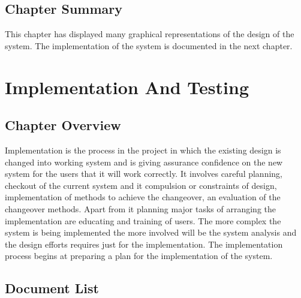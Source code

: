 \documentclass[12pt,a4paper]{article}
\newcommand\tab[1][1cm]{\hspace*{#1}}
\begin{document}
\begin{comment}
\subsection{Flow Charts}
	A flow chart is a diagram used to represent the process flow of an algorithm, problem or some transaction
within a business. Therefore a flow chart (Figure \ref{fig:flowchart}) was used to graphically represent the process
flow of an order.
\begin{figure}[H]
		\centering
		\texttt{[image: /home/basedul/Documents/Report-writing-using-latex/ResturentManagementSystemReport/flowchart.png]}
		\caption{Flow chart to show the flow of events of an order..}
		\label{fig:flowchart} 
\end{figure}
\end{comment}

\subsection{Chapter Summary}
	\tab This chapter has displayed many graphical representations of the design of the system. The implementation of the system is documented in the next chapter.
\newpage
\section{Implementation And Testing}
	\subsection{Chapter Overview}
	\tab Implementation is the process in the project in which the existing design is changed into working system and is giving assurance confidence on the new system for the users that it will work correctly. It involves careful planning, checkout of the current system and it compulsion or constraints of design, implementation of methods to achieve the changeover, an evaluation of the changeover methods. Apart from it planning major tasks of arranging the implementation are educating and training of users. The more complex the system is being implemented the more involved will be the system analysis and the design efforts requires just for the implementation. The implementation process begins at preparing a plan for the implementation of the system.
	\subsection{Document List}
	
\end{document}
